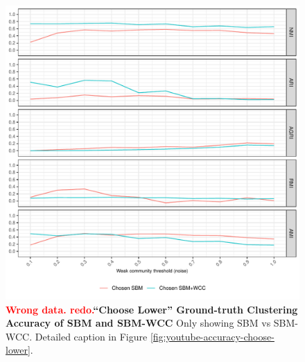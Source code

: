 \documentclass[aps,pre,superscriptaddress]{revtex4}
\begin{document}
\begin{figure}[!htpb]
\centering
\includegraphics[]{figures/choose_lower_youtube_sbm_accuracy.pdf}
\caption[]{\textbf{\textcolor{red}{Wrong data. redo.}``Choose Lower'' Ground-truth Clustering Accuracy of SBM and SBM-WCC} Only showing SBM vs SBM-WCC. Detailed caption in Figure \ref{fig:youtube-accuracy-choose-lower}.}
\label{fig:choose-lower-sbm}
\end{figure}
\end{document}
